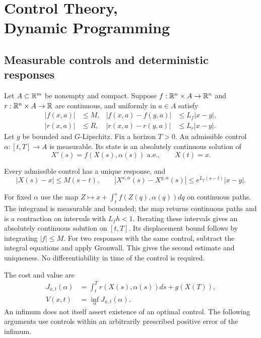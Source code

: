 \section[Control Theory, Dynamic Programming]{Control Theory,\texorpdfstring{\\}{ }Dynamic Programming}
\label{sec:10-3}
\subsection{Measurable controls and deterministic responses}
Let $A\subset\mathbb{R}^m$ be nonempty and compact. Suppose
$f:\mathbb{R}^n\times A\to\mathbb{R}^n$ and $r:\mathbb{R}^n\times A\to\mathbb{R}$ are continuous,
and uniformly in $a\in A$ satisfy
\[
 \begin{aligned}
 |f(x,a)|&\leq M,& |f(x,a)-f(y,a)|&\leq L_f|x-y|,\\
 |r(x,a)|&\leq R,& |r(x,a)-r(y,a)|&\leq L_r|x-y|.
 \end{aligned}
\]
Let $g$ be bounded and $G$-Lipschitz. Fix a horizon $T>0$.
An admissible control $\alpha:[t,T]\to A$ is measurable. Its state is
an absolutely continuous solution of
\begin{equation}\label{eq:10-control-ode}
 X'(s)=f(X(s),\alpha(s))\text{ a.e.},\qquad X(t)=x.
\end{equation}
\Needspace{50mm}
\begin{lemma}
Every admissible control has a unique response, and
\[
 |X(s)-x|\leq M(s-t),\qquad
 |X^{x,\alpha}(s)-X^{y,\alpha}(s)|\leq e^{L_f(s-t)}|x-y|.
\]
\end{lemma}
\begin{expandedproof}
For fixed $\alpha$ use the map
$Z\mapsto x+\int_t^s f(Z(q),\alpha(q))dq$ on continuous paths.
The integrand is measurable and bounded; the map returns continuous
paths and is a contraction on intervals with $L_fh<1$.
Iterating these intervals gives an absolutely continuous solution on
$[t,T]$. Its displacement bound follows by integrating $|f|\leq M$.
For two responses with the same control, subtract the integral equations
and apply Gronwall. This gives the second estimate and uniqueness.
No differentiability in time of the control is required.
\end{expandedproof}
The cost and value are
\begin{equation}\label{eq:10-value}
 \begin{split}
 J_{x,t}(\alpha)&=\int_t^T r(X(s),\alpha(s))ds+g(X(T)),\\
 V(x,t)&=\inf_\alpha J_{x,t}(\alpha).
 \end{split}
\end{equation}
An infimum does not itself assert existence of an optimal control.
The following arguments use controls within an arbitrarily prescribed
positive error of the infimum.
\Needspace{42mm}

